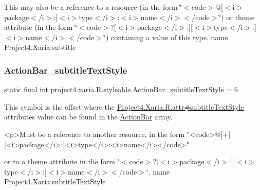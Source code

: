 This may also be a reference to a resource (in the form \char`\"{}$<$code$>$@\mbox{[}$<$i$>$package$<$/i$>$\+:\mbox{]}$<$i$>$type$<$/i$>$\+:$<$i$>$name$<$/i$>$$<$/code$>$\char`\"{}) or theme attribute (in the form \char`\"{}$<$code$>$?\mbox{[}$<$i$>$package$<$/i$>$\+:\mbox{]}\mbox{[}$<$i$>$type$<$/i$>$\+:\mbox{]}$<$i$>$name$<$/i$>$$<$/code$>$\char`\"{}) containing a value of this type.  name Project4.\+Xaria\+:subtitle \mbox{\label{classproject4_1_1xaria_1_1R_1_1styleable_a88fa5db9b1092133d576b1174279baa1}} 
\subsubsection{\texorpdfstring{Action\+Bar\+\_\+subtitle\+Text\+Style}{ActionBar\_subtitleTextStyle}}
{\footnotesize\ttfamily static final int project4.\+xaria.\+R.\+styleable.\+Action\+Bar\+\_\+subtitle\+Text\+Style = 6\hspace{0.3cm}{\ttfamily [static]}}

This symbol is the offset where the \hyperlink{}{Project4.\+Xaria.\+R.\+attr\#subtitle\+Text\+Style} attribute\textquotesingle{}s value can be found in the \hyperlink{classproject4_1_1xaria_1_1R_1_1styleable_accb530194c58ee3abb15587da8869e99}{Action\+Bar} array.

\begin{DoxyVerb}      <p>Must be a reference to another resource, in the form "<code>@[+][<i>package</i>:]<i>type</i>:<i>name</i></code>"
\end{DoxyVerb}
 or to a theme attribute in the form \char`\"{}$<$code$>$?\mbox{[}$<$i$>$package$<$/i$>$\+:\mbox{]}\mbox{[}$<$i$>$type$<$/i$>$\+:\mbox{]}$<$i$>$name$<$/i$>$$<$/code$>$\char`\"{}.  name Project4.\+Xaria\+:subtitle\+Text\+Style \mbox{\label{classproject4_1_1xaria_1_1R_1_1styleable_a5d0e4c195dd446c70c4981931970d991}} 
